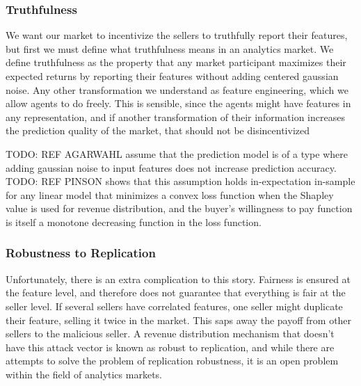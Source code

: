 




\subsubsection{Truthfulness}

We want our market to incentivize the sellers to truthfully report their
features, but first we must define what truthfulness means in an analytics
market. We define truthfulness as the property that any market participant
maximizes their expected returns by reporting their features without adding
centered gaussian noise. Any other transformation we understand as feature
engineering, which we allow agents to do freely. This is sensible, since the
agents might have features in any representation, and if another transformation
of their information increases the prediction quality of the market, that
should not be disincentivized

TODO: REF AGARWAHL assume that the prediction model is of a type where adding
gaussian noise to input features does not increase prediction accuracy. TODO:
REF PINSON shows that this assumption holds in-expectation in-sample for any
linear model that minimizes a convex loss function when the Shapley value is
used for revenue distribution, and the buyer's willingness to pay function is
itself a monotone decreasing function in the loss function.

\subsubsection{Robustness to Replication}

Unfortunately, there is an extra complication to this story. Fairness is
ensured at the feature level, and therefore does not guarantee that everything
is fair at the seller level. If several sellers have correlated features, one
seller might duplicate their feature, selling it twice in the market. This saps
away the payoff from other sellers to the malicious seller. A revenue
distribution mechanism that doesn't have this attack vector is known as robust
to replication, and while there are attempts to solve the problem of
replication robustness, it is an open problem within the field of analytics
markets.


